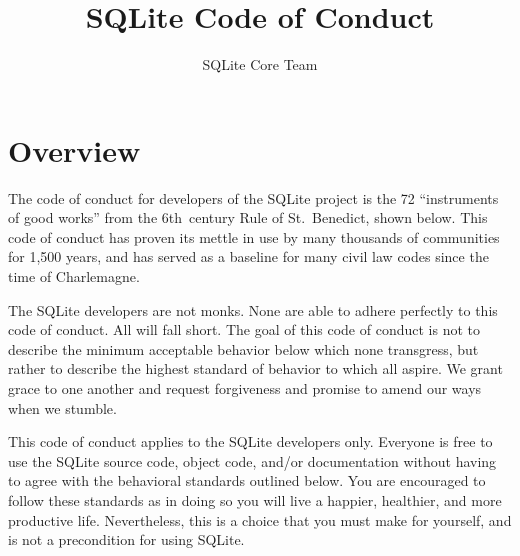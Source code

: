 \documentclass[12pt,letterpaper]{article}
\title{SQLite Code of Conduct}
\author{SQLite Core Team}
\date{}
\begin{document}
\maketitle

\section*{Overview}
The code of conduct for developers of the SQLite project is the 72
``instruments of good works'' from the 6th~century Rule of
St.~Benedict, shown below. This code of conduct has proven its mettle
in use by many thousands of communities for 1,500 years, and has
served as a baseline for many civil law codes since the time of
Charlemagne.

The SQLite developers are not monks. None are able to adhere perfectly
to this code of conduct. All will fall short. The goal of this code of
conduct is not to describe the minimum acceptable behavior below which
none transgress, but rather to describe the highest standard of
behavior to which all aspire. We grant grace to one another and
request forgiveness and promise to amend our ways when we stumble.

This code of conduct applies to the SQLite developers only. Everyone
is free to use the SQLite source code, object code, and/or
documentation without having to agree with the behavioral standards
outlined below. You are encouraged to follow these standards as in
doing so you will live a happier, healthier, and more productive
life. Nevertheless, this is a choice that you must make for yourself,
and is not a precondition for using SQLite.
\end{document}
